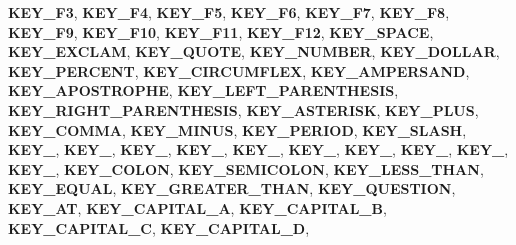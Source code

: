 \begin{DoxyCompactItemize}
{\bfseries K\+E\+Y\+\_\+\+F3}, 
{\bfseries K\+E\+Y\+\_\+\+F4}, 
{\bfseries K\+E\+Y\+\_\+\+F5}, 
\newline
{\bfseries K\+E\+Y\+\_\+\+F6}, 
{\bfseries K\+E\+Y\+\_\+\+F7}, 
{\bfseries K\+E\+Y\+\_\+\+F8}, 
{\bfseries K\+E\+Y\+\_\+\+F9}, 
\newline
{\bfseries K\+E\+Y\+\_\+\+F10}, 
{\bfseries K\+E\+Y\+\_\+\+F11}, 
{\bfseries K\+E\+Y\+\_\+\+F12}, 
{\bfseries K\+E\+Y\+\_\+\+S\+P\+A\+CE}, 
\newline
{\bfseries K\+E\+Y\+\_\+\+E\+X\+C\+L\+AM}, 
{\bfseries K\+E\+Y\+\_\+\+Q\+U\+O\+TE}, 
{\bfseries K\+E\+Y\+\_\+\+N\+U\+M\+B\+ER}, 
{\bfseries K\+E\+Y\+\_\+\+D\+O\+L\+L\+AR}, 
\newline
{\bfseries K\+E\+Y\+\_\+\+P\+E\+R\+C\+E\+NT}, 
{\bfseries K\+E\+Y\+\_\+\+C\+I\+R\+C\+U\+M\+F\+L\+EX}, 
{\bfseries K\+E\+Y\+\_\+\+A\+M\+P\+E\+R\+S\+A\+ND}, 
{\bfseries K\+E\+Y\+\_\+\+A\+P\+O\+S\+T\+R\+O\+P\+HE}, 
\newline
{\bfseries K\+E\+Y\+\_\+\+L\+E\+F\+T\+\_\+\+P\+A\+R\+E\+N\+T\+H\+E\+S\+IS}, 
{\bfseries K\+E\+Y\+\_\+\+R\+I\+G\+H\+T\+\_\+\+P\+A\+R\+E\+N\+T\+H\+E\+S\+IS}, 
{\bfseries K\+E\+Y\+\_\+\+A\+S\+T\+E\+R\+I\+SK}, 
{\bfseries K\+E\+Y\+\_\+\+P\+L\+US}, 
\newline
{\bfseries K\+E\+Y\+\_\+\+C\+O\+M\+MA}, 
{\bfseries K\+E\+Y\+\_\+\+M\+I\+N\+US}, 
{\bfseries K\+E\+Y\+\_\+\+P\+E\+R\+I\+OD}, 
{\bfseries K\+E\+Y\+\_\+\+S\+L\+A\+SH}, 
\newline
{\bfseries K\+E\+Y\+\_}, 
{\bfseries K\+E\+Y\+\_}, 
{\bfseries K\+E\+Y\+\_}, 
{\bfseries K\+E\+Y\+\_}, 
\newline
{\bfseries K\+E\+Y\+\_}, 
{\bfseries K\+E\+Y\+\_}, 
{\bfseries K\+E\+Y\+\_}, 
{\bfseries K\+E\+Y\+\_}, 
\newline
{\bfseries K\+E\+Y\+\_}, 
{\bfseries K\+E\+Y\+\_}, 
{\bfseries K\+E\+Y\+\_\+\+C\+O\+L\+ON}, 
{\bfseries K\+E\+Y\+\_\+\+S\+E\+M\+I\+C\+O\+L\+ON}, 
\newline
{\bfseries K\+E\+Y\+\_\+\+L\+E\+S\+S\+\_\+\+T\+H\+AN}, 
{\bfseries K\+E\+Y\+\_\+\+E\+Q\+U\+AL}, 
{\bfseries K\+E\+Y\+\_\+\+G\+R\+E\+A\+T\+E\+R\+\_\+\+T\+H\+AN}, 
{\bfseries K\+E\+Y\+\_\+\+Q\+U\+E\+S\+T\+I\+ON}, 
\newline
{\bfseries K\+E\+Y\+\_\+\+AT}, 
{\bfseries K\+E\+Y\+\_\+\+C\+A\+P\+I\+T\+A\+L\+\_\+A}, 
{\bfseries K\+E\+Y\+\_\+\+C\+A\+P\+I\+T\+A\+L\+\_\+B}, 
{\bfseries K\+E\+Y\+\_\+\+C\+A\+P\+I\+T\+A\+L\+\_\+C}, 
\newline
{\bfseries K\+E\+Y\+\_\+\+C\+A\+P\+I\+T\+A\+L\+\_\+D}, 

\end{DoxyCompactItemize}
